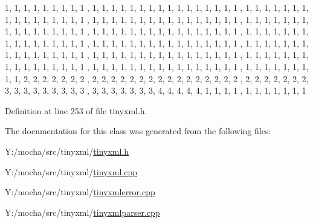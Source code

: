 \begin{DoxyCode}
{                1,      1,      1,      1,      1,      1,      1,      1,      1
      ,       1,      1,      1,      1,      1,      1,      1,      
                1,      1,      1,      1,      1,      1,      1,      1,      1
      ,       1,      1,      1,      1,      1,      1,      1,      
                1,      1,      1,      1,      1,      1,      1,      1,      1
      ,       1,      1,      1,      1,      1,      1,      1,      
                1,      1,      1,      1,      1,      1,      1,      1,      1
      ,       1,      1,      1,      1,      1,      1,      1,      
                1,      1,      1,      1,      1,      1,      1,      1,      1
      ,       1,      1,      1,      1,      1,      1,      1,      
                1,      1,      1,      1,      1,      1,      1,      1,      1
      ,       1,      1,      1,      1,      1,      1,      1,      
                1,      1,      1,      1,      1,      1,      1,      1,      1
      ,       1,      1,      1,      1,      1,      1,      1,      
                1,      1,      1,      1,      1,      1,      1,      1,      1
      ,       1,      1,      1,      1,      1,      1,      1,      
                1,      1,      1,      1,      1,      1,      1,      1,      1
      ,       1,      1,      1,      1,      1,      1,      1,      
                1,      1,      1,      1,      1,      1,      1,      1,      1
      ,       1,      1,      1,      1,      1,      1,      1,      
                1,      1,      1,      1,      1,      1,      1,      1,      1
      ,       1,      1,      1,      1,      1,      1,      1,      
                1,      1,      1,      1,      1,      1,      1,      1,      1
      ,       1,      1,      1,      1,      1,      1,      1,      
                1,      1,      2,      2,      2,      2,      2,      2,      2
      ,       2,      2,      2,      2,      2,      2,      2,      
                2,      2,      2,      2,      2,      2,      2,      2,      2
      ,       2,      2,      2,      2,      2,      2,      2,      
                3,      3,      3,      3,      3,      3,      3,      3,      3
      ,       3,      3,      3,      3,      3,      3,      3,      
                4,      4,      4,      4,      4,      1,      1,      1,      1
      ,       1,      1,      1,      1,      1,      1,      1       
}
\end{DoxyCode}


Definition at line 253 of file tinyxml.h.



The documentation for this class was generated from the following files:\begin{DoxyCompactItemize}
\item 
Y:/mocha/src/tinyxml/\hyperlink{tinyxml_8h}{tinyxml.h}\item 
Y:/mocha/src/tinyxml/\hyperlink{tinyxml_8cpp}{tinyxml.cpp}\item 
Y:/mocha/src/tinyxml/\hyperlink{tinyxmlerror_8cpp}{tinyxmlerror.cpp}\item 
Y:/mocha/src/tinyxml/\hyperlink{tinyxmlparser_8cpp}{tinyxmlparser.cpp}\end{DoxyCompactItemize}
